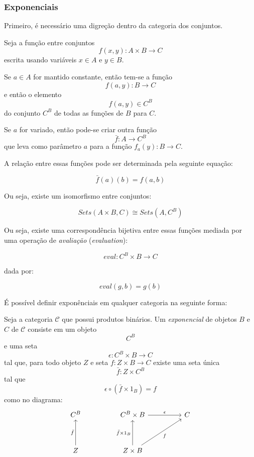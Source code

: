 \documentclass[../main.tex]{subfiles}
\begin{document}
\subsubsection{Exponenciais}

Primeiro, é necessário uma digreção dentro da categoria dos conjuntos.

Seja a função entre conjuntos $$f(x, y) : A \times B \to C$$ escrita usando variáveis $x \in A$ e $y \in B$.

Se $a \in A$ for mantido constante, então tem-se a função $$f(a, y) : B \to C$$ e então o elemento $$f(a, y) \in C^B$$ do conjunto $C^B$ de todas as funções de $B$ para $C$. 

Se $a$ for variado, então pode-se criar outra função $$\bar{f} : A \to C^B$$ que leva como parâmetro $a$ para a função $f_a(y) : B \to C$.

A relação entre essas funções pode ser determinada pela seguinte equação:

$$\bar{f}(a)(b) = f(a, b)$$

Ou seja, existe um isomorfismo entre conjuntos:

$$Sets(A \times B, C) \cong Sets(A, C^B)$$

Ou seja, existe uma correspondência bijetiva entre essas funções mediada por uma operação de \emph{avaliação} (\emph{evaluation}):

$$eval : C^B \times B \to C$$

dada por:

$$eval(g, b) = g(b)$$

É possível definir exponênciais em qualquer categoria na seguinte forma:

\begin{definition}
    Seja a categoria $\mathcal{C}$ que possui produtos binários. Um \emph{exponencial} de objetos $B$ e $C$ de $\mathcal{C}$ consiste em um objeto $$C^B$$ e uma seta $$\epsilon : C^B \times B \to C$$ tal que, para todo objeto $Z$ e seta $f : Z \times B \to C$ existe uma seta única $$\bar{f} : Z \times C^B$$ tal que $$\epsilon \circ (\bar{f} \times 1_B) = f$$ como no diagrama:
    \[\begin{tikzcd}
        {C^B} && {C^B \times B} && C \\
        \\
        Z && {Z \times B}
        \arrow["\epsilon", from=1-3, to=1-5]
        \arrow["{\bar{f}}", from=3-1, to=1-1]
        \arrow["{\bar{f} \times 1_B}", from=3-3, to=1-3]
        \arrow["f"', from=3-3, to=1-5]
    \end{tikzcd}\]
\end{definition}
\end{document}
